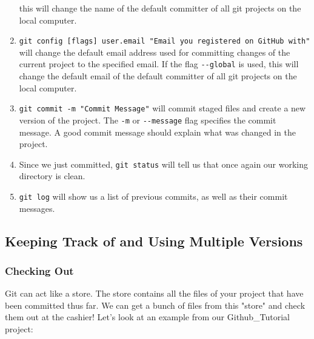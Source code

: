 \documentclass[11pt,fleqn]{article}
\theoremstyle{definition}
\begin{document}
\begin{enumerate}
    this will change the name of the default committer of all git projects on
    the local computer.
\item \verb|git config [flags] user.email "Email you registered on GitHub with"|
    will change the default email address used for committing changes of the
    current project to the specified email. If the flag \verb|--global| is used,
    this will change the default email of the default committer of all git
    projects on the local computer.
\item \verb|git commit -m "Commit Message"| will commit staged files and create
    a new version of the project. The \verb|-m| or \verb|--message| flag
    specifies the commit message. A good commit message should explain what was
    changed in the project.
\item Since we just committed, \verb|git status| will tell us that once again
    our working directory is clean.
\item \verb|git log| will show us a list of previous commits, as well as their
    commit messages.
\end{enumerate}

\newpage
\subsection{Keeping Track of and Using Multiple Versions}

\subsubsection{Checking Out}
Git can act like a store. The store contains all the files of your project that
have been committed thus far. We can get a bunch of files from this "store" and
check them out at the cashier! Let's look at an example from our
Github\_Tutorial project:
\end{document}
